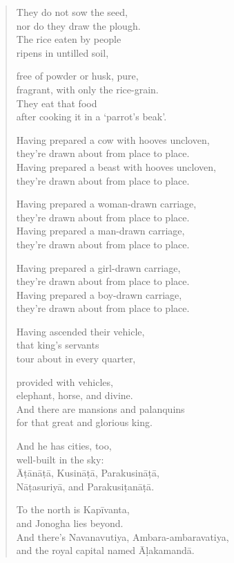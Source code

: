 \documentclass[12pt,openany]{book}%
\begin{document}
\begin{verse}
They do not sow the seed, \\
nor do they draw the plough. \\
The rice eaten by people \\
ripens in untilled soil, 

free of powder or husk, pure, \\
fragrant, with only the rice-grain. \\
They eat that food \\
after cooking it in a ‘parrot’s beak’. 

Having prepared a cow with hooves uncloven, \\
they’re drawn about from place to place. \\
Having prepared a beast with hooves uncloven, \\
they’re drawn about from place to place. 

Having prepared a woman-drawn carriage, \\
they’re drawn about from place to place. \\
Having prepared a man-drawn carriage, \\
they’re drawn about from place to place. 

Having prepared a girl-drawn carriage, \\
they’re drawn about from place to place. \\
Having prepared a boy-drawn carriage, \\
they’re drawn about from place to place. 

Having ascended their vehicle, \\
that king’s servants \\
tour about in every quarter, 

provided with vehicles, \\
elephant, horse, and divine. \\
And there are mansions and palanquins \\
for that great and glorious king. 

And he has cities, too, \\
well-built in the sky: \\
\textsanskrit{Āṭānāṭā}, \textsanskrit{Kusināṭā}, \textsanskrit{Parakusināṭā}, \\
\textsanskrit{Nāṭasuriyā}, and \textsanskrit{Parakusiṭanāṭā}. 

To the north is \textsanskrit{Kapīvanta}, \\
and Jonogha lies beyond. \\
And there’s Navanavutiya, Ambara-ambaravatiya, \\
and the royal capital named \textsanskrit{Āḷakamandā}. 


\end{verse}
\end{document}
